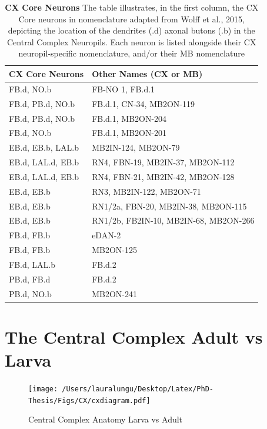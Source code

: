             \begin{table}[h!]
            \centering
            \begin{tabular}{|l|l|}
            \hline
            \textbf{CX Core Neurons} & \textbf{Other Names (CX or MB)} \\
            \hline
            FB.d, NO.b & FB-NO 1, FB.d.1 \\
            FB.d, PB.d, NO.b & FB.d.1, CN-34, MB2ON-119 \\
            FB.d, PB.d, NO.b & FB.d.1, MB2ON-204 \\
            FB.d, NO.b & FB.d.1, MB2ON-201 \\
            EB.d, EB.b, LAL.b & MB2IN-124, MB2ON-79 \\
            EB.d, LAL.d, EB.b & RN4, FBN-19, MB2IN-37, MB2ON-112 \\
            EB.d, LAL.d, EB.b & RN4, FBN-21, MB2IN-42, MB2ON-128 \\
            EB.d, EB.b & RN3, MB2IN-122, MB2ON-71 \\
            EB.d, EB.b & RN1/2a, FBN-20, MB2IN-38, MB2ON-115 \\
            EB.d, EB.b & RN1/2b, FB2IN-10, MB2IN-68, MB2ON-266 \\
            FB.d, FB.b & eDAN-2 \\
            FB.d, FB.b & MB2ON-125 \\
            FB.d, LAL.b & FB.d.2 \\
            PB.d, FB.d & FB.d.2 \\
            PB.d, NO.b & MB2ON-241 \\
            \hline
            \end{tabular}
            \caption[CX Core Neurons]{\textbf{CX Core Neurons} The table illustrates, in the first column, the CX Core neurons in nomenclature adapted from Wolff et al., 2015\citep{wolff2018neuroarchitecture}, depicting the location of the dendrites (.d) axonal butons (.b) in the Central Complex Neuropils. Each neuron is listed alongside their CX neuropil-specific nomenclature, and/or their MB nomenclature}
            \label{CXCoreNeurons}
            \end{table}


    


\section{The Central Complex Adult vs Larva}
    \begin{figure}
        \centering
        \texttt{[image: /Users/lauralungu/Desktop/Latex/PhD-Thesis/Figs/CX/cxdiagram.pdf]}
        \caption[Central Complex Anatomy Larva vs Adult]{Central Complex Anatomy Larva vs Adult}
        \label{cxdiagram}
    \end{figure}

